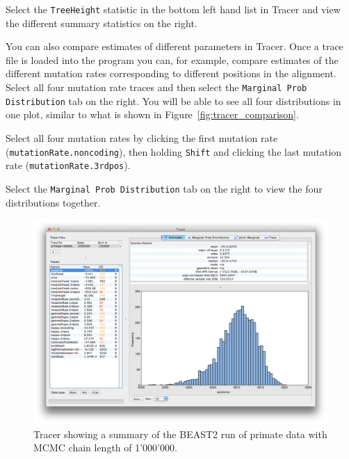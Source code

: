 \documentclass[11pt]{article}
\begin{document}
\begin{framed}
Select the \texttt{TreeHeight} statistic in the bottom left hand list in Tracer and view the different summary statistics on the right.
\end{framed}

You can also compare estimates of different parameters in Tracer. Once a trace file is loaded into the program you can, for example, compare estimates of the different mutation rates corresponding to different positions in the alignment. Select all four mutation rate traces and then select the \texttt{Marginal Prob Distribution} tab on the right. You will be able to see all four distributions in one plot, similar to what is shown in Figure~\ref{fig:tracer_comparison}.

\begin{framed}
Select all four mutation rates by clicking the first mutation rate (\texttt{mutationRate.noncoding}), then holding \texttt{Shift} and clicking the last mutation rate (\texttt{mutationRate.3rdpos}).

Select the \texttt{Marginal Prob Distribution} tab on the right to view the four distributions together.
\end{framed}

\begin{figure}[H]
\centering
\includegraphics[width=5in]{figures/tracer_bad.png}
\caption{\small Tracer showing a summary of the BEAST2 run of primate data with MCMC chain length of 1'000'000.}
\label{fig:tracer_bad}
\end{figure}
\end{document}
